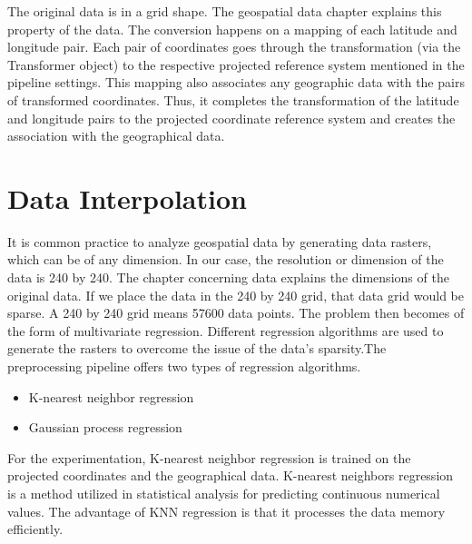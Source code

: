 The original data is in a grid shape. The geospatial data chapter explains this property of the data. The conversion happens on a mapping of each latitude and longitude pair. Each pair of coordinates goes through the transformation (via the Transformer object) to the respective projected reference system mentioned in the pipeline settings. This mapping also associates any geographic data with the pairs of transformed coordinates. Thus, it completes the transformation of the latitude and longitude pairs to the projected coordinate reference system and creates the association with the geographical data.


\section{Data Interpolation }
It is common practice to analyze geospatial data by generating data rasters, which can be of any dimension. In our case, the resolution or dimension of the data is 240 by 240. The chapter concerning data explains the dimensions of the original data. If we place the data in the 240 by 240 grid, that data grid would be sparse. A 240 by 240 grid means 57600 data points. The problem then becomes of the form of multivariate regression. Different regression algorithms are used to generate the rasters to overcome the issue of the data's sparsity.The preprocessing pipeline offers two types of regression algorithms.

\begin{itemize}
    \item K-nearest neighbor regression
    \item Gaussian process regression
\end{itemize}
For the experimentation, K-nearest neighbor regression is trained on the projected coordinates and the geographical data. K-nearest neighbors regression is a method utilized in statistical analysis for predicting continuous numerical values. The advantage of KNN regression is that it processes the data memory efficiently.

